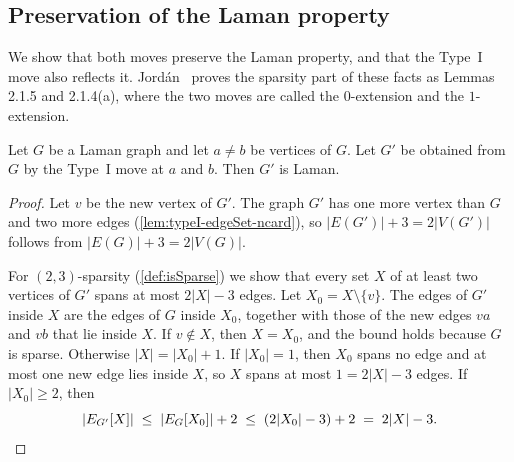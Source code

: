 \subsection{Preservation of the Laman property}

We show that both moves preserve the Laman property, and that the
Type~I move also reflects it. Jord\'an~\cite{jordan2016} proves the
sparsity part of these facts as Lemmas 2.1.5 and 2.1.4(a), where the
two moves are called the $0$-extension and the $1$-extension.

\begin{theorem}
  \label{thm:typeI-isLaman}
  \leanok
  Let $G$ be a Laman graph and let $a \ne b$ be vertices of $G$. Let
  $G'$ be obtained from $G$ by the Type~I move at $a$ and $b$. Then
  $G'$ is Laman.
\end{theorem}
\begin{proof}
  \leanok
  Let $v$ be the new vertex of $G'$. The graph $G'$ has one more vertex
  than $G$ and two more edges (\cref{lem:typeI-edgeSet-ncard}), so
  $|E(G')| + 3 = 2|V(G')|$ follows from $|E(G)| + 3 = 2|V(G)|$.

  For $(2,3)$-sparsity (\cref{def:isSparse}) we show that every set $X$
  of at least two vertices of $G'$ spans at most $2|X| - 3$ edges. Let
  $X_0 = X \setminus \{v\}$. The edges of $G'$ inside $X$ are the edges
  of $G$ inside $X_0$, together with those of the new edges $va$ and
  $vb$ that lie inside $X$. If $v \notin X$, then $X = X_0$, and the
  bound holds because $G$ is sparse. Otherwise $|X| = |X_0| + 1$. If
  $|X_0| = 1$, then $X_0$ spans no edge and at most one new edge lies
  inside $X$, so $X$ spans at most $1 = 2|X| - 3$ edges. If
  $|X_0| \ge 2$, then
  \[
    |\edgesIn[G']{X}| \;\le\; |\edgesIn{X_0}| + 2
    \;\le\; (2|X_0| - 3) + 2 \;=\; 2|X| - 3.
  \]
\end{proof}

